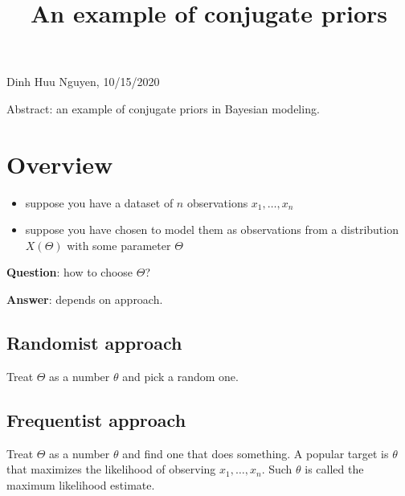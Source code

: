 \documentclass[14pt, reqno]{amsart}
\title{An example of conjugate priors}
\theoremstyle{definition}
\begin{document}
\maketitle

\begin{center}
Dinh Huu Nguyen, 10/15/2020
\end{center}
\vspace{20pt}

Abstract: an example of conjugate priors in Bayesian modeling.

\tableofcontents

\section{Overview}
\begin{itemize}
\item suppose you have a dataset of $n$ observations $x_1, \dots, x_n$
\item suppose you have chosen to model them as observations from a distribution $X(\Theta)$ with some parameter $\Theta$
\end{itemize}
\vspace{10pt}

\textbf{Question}: how to choose $\Theta$?
\vspace{10pt}

\textbf{Answer}: depends on approach.
\vfill
\pagebreak

\subsection{Randomist approach} Treat $\Theta$ as a number $\theta$ and pick a random one.
\vfill
\pagebreak

\subsection{Frequentist approach} Treat $\Theta$ as a number $\theta$ and find one that does something. A popular target is $\theta$ that maximizes the likelihood of observing $x_1, \dots, x_n$. Such $\theta$ is called the maximum likelihood estimate.
\vfill
\pagebreak
\end{document}
